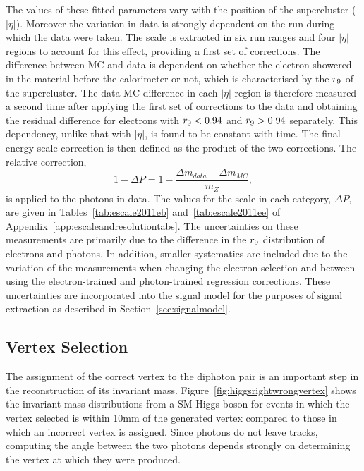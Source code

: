 The values of these fitted parameters vary with the position of the supercluster ($|\eta|$). Moreover the
variation in data is strongly dependent on the run during which the data were taken. The scale is extracted in 
six run ranges and four $|\eta|$ regions to account for this effect, providing a first set of corrections. 
The difference between MC and data is dependent on whether the electron showered in the material before the calorimeter
 or not, which is characterised by the $r_{9}$ of the supercluster. 
The data-MC difference in each $|\eta|$ region is therefore measured
a second time after applying the first set of corrections to the data and obtaining the residual difference
for electrons with $r_{9}<0.94$ and $r_{9}>0.94$ separately. This dependency, 
unlike that with $|\eta|$, is found to be constant with time. The final energy scale correction is then defined
as the product of the two corrections. The relative correction, 
\begin{equation}
1-\Delta P = 1 - \frac {\displaystyle \Delta m_{data} - \Delta m_{MC} }{\displaystyle m_{Z} },
\end{equation}
is applied to the photons in data. The values for the scale in each category, $\Delta P$, are given in 
Tables~\ref{tab:escale2011eb} and~\ref{tab:escale2011ee} of Appendix~\ref{app:escaleandresolutiontabs}. 
The uncertainties on these measurements are primarily due to 
the difference in the $r_{9}$ distribution of electrons and photons. In addition, smaller systematics
are included due to the variation of the measurements when changing the electron selection and
between using the electron-trained and photon-trained regression corrections.
These uncertainties are incorporated into the signal model for the purposes of 
signal extraction as described in Section~\ref{sec:signalmodel}.

\subsection{Vertex Selection}
\label{sec:vertexselection}

The assignment of the correct vertex to the diphoton pair is an important step in the reconstruction of 
its invariant mass. Figure~\ref{fig:higgsrightwrongvertex} shows the invariant mass distributions from a SM
Higgs boson for events in which the vertex selected is within 10mm of the generated vertex
compared to those in which an incorrect vertex is assigned. 
Since photons do not leave tracks, computing the angle between the two photons 
depends strongly on determining the vertex at which they were produced.

